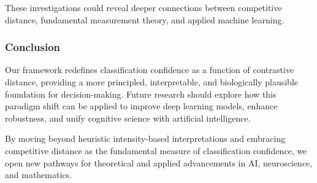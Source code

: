 These investigations could reveal deeper connections between competitive distance, fundamental measurement theory, and applied machine learning.

\subsubsection{Conclusion}

Our framework redefines classification confidence as a function of contrastive distance, providing a more principled, interpretable, and biologically plausible foundation for decision-making. Future research should explore how this paradigm shift can be applied to improve deep learning models, enhance robustness, and unify cognitive science with artificial intelligence.

By moving beyond heuristic intensity-based interpretations and embracing competitive distance as the fundamental measure of classification confidence, we open new pathways for theoretical and applied advancements in AI, neuroscience, and mathematics.
